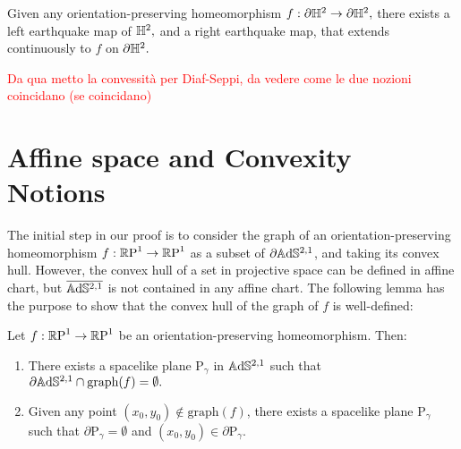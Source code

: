 \begin{theorem}
    Given any orientation-preserving homeomorphism $f:\partial\mathbb{H}^2\to\partial\mathbb{H}^2,$ there exists a left earthquake map of $\mathbb{H}^2,$ and a right earthquake map, that extends continuously to $f$ on $\partial\mathbb{H}^2.$
\end{theorem}


\textcolor{red}{Da qua metto la convessità per Diaf-Seppi, da vedere come le due nozioni coincidano (se coincidano)}
\section{Affine space and Convexity Notions}
The initial step in our proof is to consider the graph of an orientation-preserving homeomorphism $f:\mathbb{R}\text{P}^1\to\mathbb{R}\text{P}^1$ as a subset of $\partial\mathbb{A}\mathrm{d}\mathbb{S}^{2,1}$, and taking its convex hull. However, the convex hull of a set in projective space can be defined in affine chart, but $\overline{\mathbb{A}\mathrm{d}\mathbb{S}^{2,1}}$ is not contained in any affine chart. The following lemma has the purpose to show that the convex hull of the graph of $f$ is well-defined: 
\begin{lemma}\label{bdconvex}
    Let $f:\mathbb{R}\text{P}^1\to\mathbb{R}\text{P}^1$ be an orientation-preserving homeomorphism. Then: 
    \begin{enumerate}
        \item There exists a spacelike plane $\text{P}_\gamma$ in $\mathbb{A}\mathrm{d}\mathbb{S}^{2,1}$ such that $\partial\mathbb{A}\mathrm{d}\mathbb{S}^{2,1}\cap\text{graph}(f)=\emptyset.$
        \item Given any point $(x_0,y_0)\notin\text{graph}(f)$, there exists a spacelike plane $\text{P}_\gamma$ such that $\partial\text{P}_\gamma=\emptyset$ and $(x_0,y_0)\in\partial\text{P}_\gamma.$ 
    \end{enumerate}
\end{lemma}

